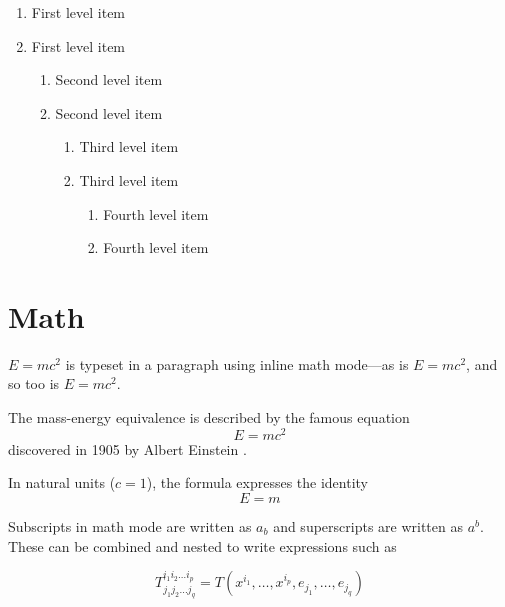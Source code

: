 \documentclass[12pt, a4paper]{article} %
\begin{document}
        \begin{enumerate}
            \item First level item
            \item First level item

            \begin{enumerate}
                \item Second level item
                \item Second level item

                \begin{enumerate}
                    \item Third level item
                    \item Third level item

                    \begin{enumerate}
                        \item Fourth level item
                        \item Fourth level item
                    \end{enumerate}
                \end{enumerate}
            \end{enumerate}
        \end{enumerate}

    \section{Math}
        \begin{math}                                           %
            E=mc^2
        \end{math} is typeset in a paragraph using inline math mode---as is $E=mc^2$, and so too is \(E=mc^2\).

        The mass-energy equivalence is described by the famous equation
        \[ E=mc^2 \] discovered in 1905 by Albert Einstein \cite{Einstein1905AnP}.

        In natural units ($c = 1$), the formula expresses the identity
        \begin{equation}
            E=m
        \end{equation}

        Subscripts in math mode are written as $a_b$ and superscripts are written as $a^b$. These can be combined and nested to write expressions such as

        \[ T^{i_1 i_2 \dots i_p}_{j_1 j_2 \dots j_q} = T(x^{i_1},\dots,x^{i_p},e_{j_1},\dots,e_{j_q}) \]
\end{document}
